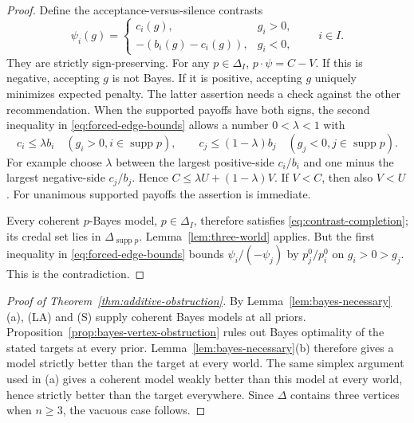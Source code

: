 \documentclass[11pt]{article}
\theoremstyle{remark}
\newcommand{\supp}{\operatorname{supp}}
\begin{document}
\begin{proof}
Define the acceptance-versus-silence contrasts
\begin{equation}
 \psi_i(g)=
 \begin{cases}
 c_i(g),&g_i>0,\\
 -(b_i(g)-c_i(g)),&g_i<0,
 \end{cases}
 \qquad i\in I.
 \label{eq:silence-contrast}
\end{equation}
They are strictly sign-preserving. For any $p\in\Delta_I$,
$p\cdot\psi=C-V$. If this is negative, accepting $g$ is not Bayes.
If it is positive, accepting $g$ uniquely minimizes expected penalty.
The latter assertion needs a check against the other recommendation.
When the supported payoffs have both signs, the second inequality in
\eqref{eq:forced-edge-bounds} allows a number $0<\lambda<1$ with
\[
 c_i\le\lambda b_i\quad(g_i>0, i\in\supp p),\qquad
 c_j\le(1-\lambda)b_j\quad(g_j<0, j\in\supp p).
\]
For example choose $\lambda$ between the largest positive-side $c_i/b_i$
and one minus the largest negative-side $c_j/b_j$.
Hence $C\le\lambda U+(1-\lambda)V$. If $V<C$, then also $V<U$.
For unanimous supported payoffs the assertion is immediate.

Every coherent $p$-Bayes model, $p\in\Delta_I$, therefore satisfies
\eqref{eq:contrast-completion}; its credal set lies in
$\Delta_{\supp p}$. Lemma~\ref{lem:three-world} applies.
But the first inequality in \eqref{eq:forced-edge-bounds} bounds
$\psi_i/(-\psi_j)$ by $p_j^0/p_i^0$ on $g_i>0>g_j$.
This is the contradiction.
\end{proof}

\begin{proof}[Proof of Theorem~\ref{thm:additive-obstruction}]
By Lemma~\ref{lem:bayes-necessary}(a), (LA) and (S) supply coherent Bayes
models at all priors. Proposition~\ref{prop:bayes-vertex-obstruction} rules
out Bayes optimality of the stated targets at every prior.
Lemma~\ref{lem:bayes-necessary}(b) therefore gives a model strictly better
than the target at every world. The same simplex argument used in (a)
gives a coherent model weakly better than this model at every world,
hence strictly better than the target everywhere.
Since $\Delta$ contains three vertices when $n\ge3$, the vacuous case follows.
\end{proof}
\end{document}
